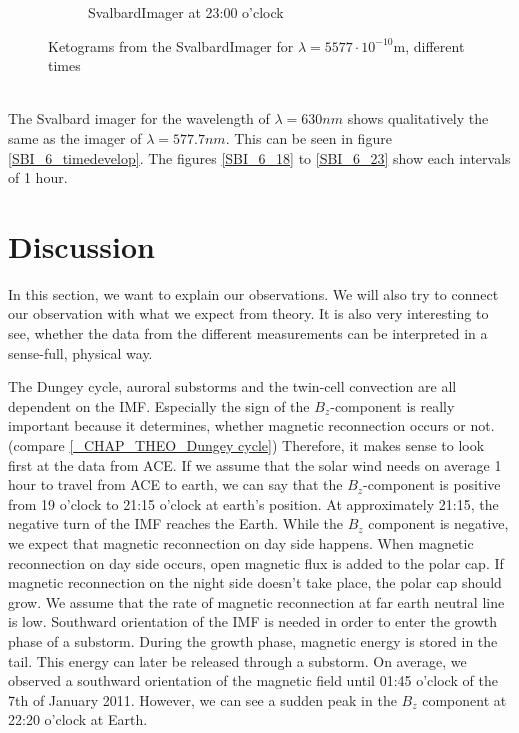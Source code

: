\documentclass[10pt,a4paper]{article}
\begin{document}
\begin{figure}[h]
\begin{subfigure}{0.3\textwidth}
	\caption{ SvalbardImager at 23:00 o'clock \label{SBI_5_23}}
\end{subfigure}
\caption{Ketograms from the SvalbardImager for $\lambda=5577 \cdot 10^{-10} \mathrm{m}$, different times }
\label{SBI_5_timedevelop}
\end{figure}
\\
The Svalbard imager for the wavelength of $\lambda=630 nm$ shows qualitatively the same as the imager of $\lambda=577.7 nm$.  This can be seen in figure \ref{SBI_6_timedevelop}. The figures \ref{SBI_6_18} to \ref{SBI_6_23} show each intervals of 1 hour. 
\clearpage


\section{Discussion \label{discussion}}

In this section, we want to explain our observations. We will also try to connect our observation with what we expect from theory. 
It is also very interesting to see, whether the data from the different measurements can be interpreted in a sense-full, physical way.

The Dungey cycle, auroral substorms and the twin-cell convection are all dependent on the IMF. Especially the sign of the $B_z$-component is really important because it determines, whether magnetic reconnection occurs or not. (compare \ref{_CHAP_THEO_Dungey cycle}) Therefore, it makes sense to look first at the data from ACE. 
If we assume that the solar wind needs on average 1 hour to travel from ACE to earth, we can say that the $B_z$-component is positive from 19 o'clock to 21:15 o'clock at earth's position. At approximately 21:15,  the negative turn of the IMF reaches the Earth. While the $B_z$ component is negative, we expect that magnetic reconnection on day side happens. When magnetic reconnection on day side occurs, open magnetic flux is added to the polar cap. If magnetic reconnection on the night side doesn't take place, the polar cap should grow. We assume that the rate of magnetic reconnection at far earth neutral line is low. 
Southward orientation of the IMF is needed in order to enter the growth phase of a substorm. During the growth phase, magnetic energy is stored in the tail. This energy can later be released through a substorm. On average, we observed a southward orientation of the magnetic field until 01:45 o'clock of the 7th of January 2011. However, we can see a sudden peak in the $B_z$ component at 22:20 o'clock at 
Earth. 
\end{document}
